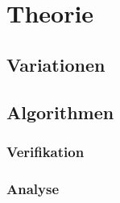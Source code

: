 \section{Theorie}

\subsection{Variationen}

\subsection{Algorithmen}

\subsubsection{Verifikation}

\subsubsection{Analyse}

